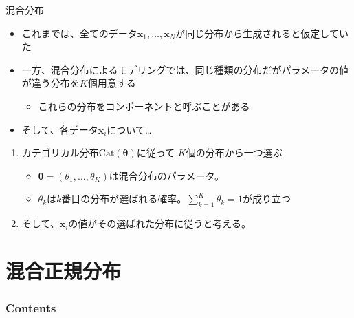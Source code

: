 \documentclass[aspectratio=169,unicode,dvipdfmx,14pt]{beamer}
\begin{document}
\begin{frame}{混合分布}
\begin{itemize}
\item これまでは、全てのデータ$\bm{x}_1, \ldots, \bm{x}_N$が同じ分布から生成されると仮定していた
\item 一方、混合分布によるモデリングでは、同じ種類の分布だがパラメータの値が違う分布を$K$個用意する
\begin{itemize}
\item これらの分布をコンポーネントと呼ぶことがある
\end{itemize}
\item そして、各データ$\bm{x}_i$について…
\end{itemize}
\begin{enumerate}
\item カテゴリカル分布$\mbox{Cat}(\bm{\theta})$に従って
$K$個の分布から一つ選ぶ
\begin{itemize}
\item $\bm{\theta}=(\theta_1,\ldots,\theta_K)$は混合分布のパラメータ。
\item $\theta_k$は$k$番目の分布が選ばれる確率。$\sum_{k=1}^K \theta_k = 1$が成り立つ
\end{itemize}
\item そして、$\bm{x}_i$の値がその選ばれた分布に従うと考える。
\end{enumerate}
\end{frame}


\section{混合正規分布}

\begin{frame}\frametitle{Contents}
\Large \tableofcontents[currentsection]
\end{frame}
\end{document}
